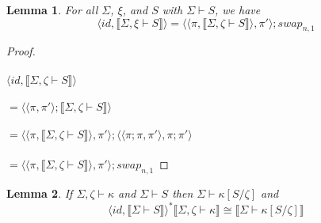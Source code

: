 \documentclass{article}
\newtheorem{lemma}{Lemma}
\newcommand{\sem}[1]{\llbracket #1 \rrbracket}
\begin{document}
\begin{lemma}
For all $\Sigma$, $\xi$, and $S$ with $\Sigma \vdash S$,  we have $$\langle \mathit{id}, \sem{\Sigma,\xi \vdash S} \rangle = \langle \langle \pi, \sem{\Sigma,\zeta \vdash S} \rangle, \pi' \rangle; \mathit{swap}_{n,1}$$
\label{lemma:subswap}
\end{lemma}

\begin{proof}~\\~\\
$\langle \mathit{id}, \sem{\Sigma,\zeta \vdash S} \rangle$\\~\\
$= \langle \langle \pi, \pi' \rangle; \sem{\Sigma, \zeta \vdash S} \rangle $\\~\\
$= \langle \langle \pi, \sem{\Sigma,\zeta \vdash S} \rangle, \pi' \rangle; \langle \langle \pi;\pi,\pi' \rangle, \pi;\pi' \rangle$\\~\\
$= \langle \langle \pi, \sem{\Sigma,\zeta \vdash S} \rangle, \pi' \rangle; swap_{n,1}$
\end{proof}

\begin{lemma}
If $\Sigma,\zeta \vdash \kappa$ and $\Sigma \vdash S$ then $\Sigma \vdash \kappa[S/\zeta]$ and $$\langle \mathit{id}, \sem{\Sigma \vdash S} \rangle^* \sem{\Sigma,\zeta \vdash \kappa} \cong \sem{\Sigma \vdash \kappa[S/\zeta]}$$ 
\end{lemma}
\end{document}
